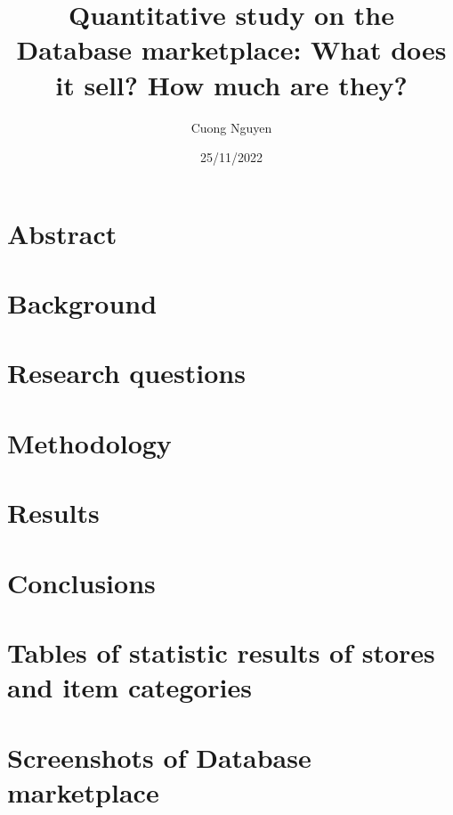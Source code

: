\documentclass{article}
\title{Quantitative study on the Database marketplace:
What does it sell? How much are they?}
\author{Cuong Nguyen}
\date{25/11/2022}
\begin{document}
    
\maketitle

\tableofcontents
\clearpage

\printnoidxglossaries{}

% 
\clearpage

\section{Abstract}\label{sec:abstract}

\clearpage

\section{Background}\label{sec:background}

\clearpage

\section{Research questions}\label{sec:research_questions}

\clearpage

\section{Methodology}\label{sec:method}

\clearpage

\section{Results}\label{sec:result}

\clearpage

\section{Conclusions}\label{sec:conclusion}

\clearpage

\printbibliography[heading=bibintoc]
\clearpage

\begin{appendices}
    \section{Tables of statistic results of stores and item categories}
    

    \section{Screenshots of Database marketplace}
    
\end{appendices}
\end{document}
